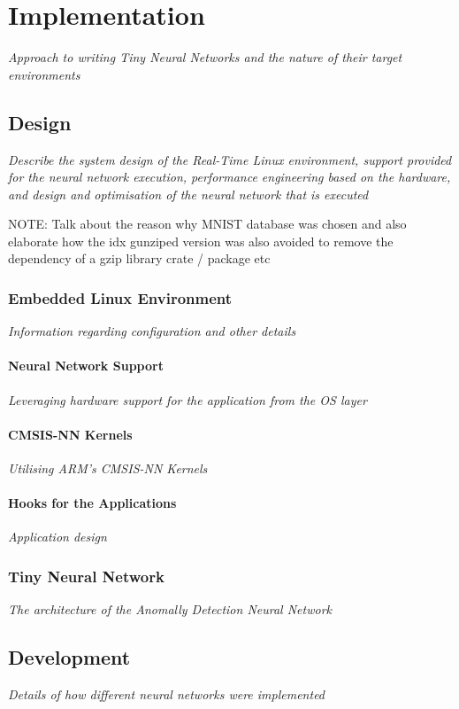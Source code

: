 \part{Implementation}

\textit{Approach to writing Tiny Neural Networks and the nature of their target environments}

\chapter{Design}
\textit{Describe the system design of the Real-Time Linux environment, support provided for the neural network execution, performance engineering based on the hardware, and design and optimisation of the neural network that is executed}

{\color{yellow}
	NOTE: Talk about the reason why MNIST database was chosen and also elaborate how the idx gunziped version was also avoided to remove the dependency of a gzip library crate / package etc
}

\section[Embedded Operating System]{Embedded Linux Environment}
\textit{Information regarding configuration and other details}

\subsection{Neural Network Support}
\textit{Leveraging hardware support for the application from the OS layer}

\subsection{CMSIS-NN Kernels}
\textit{Utilising ARM's CMSIS-NN Kernels}

\subsection{Hooks for the Applications}
\textit{Application design}

\section{Tiny Neural Network}
\textit{The architecture of the Anomally Detection Neural Network}

\chapter{Development}
\textit{Details of how different neural networks were implemented}

